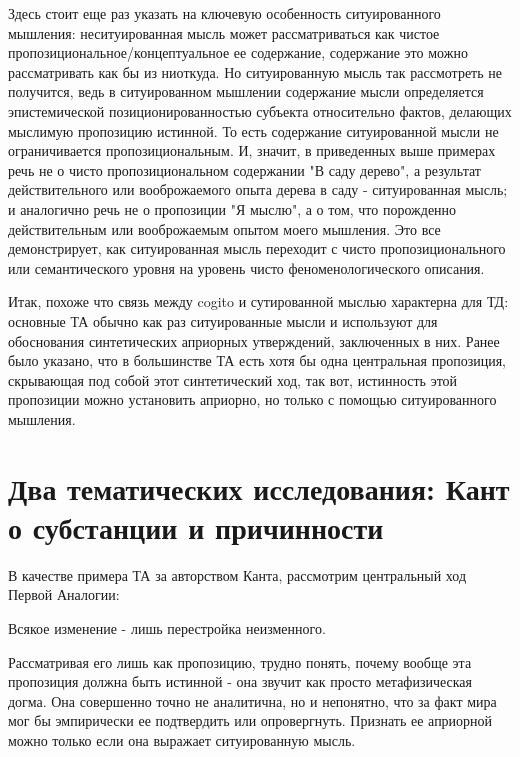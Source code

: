 \documentclass{article}
\begin{document}
Здесь стоит еще раз указать на ключевую особенность ситуированного мышления: неситуированная мысль может рассматриваться как чистое пропозициональное/концептуальное ее содержание, содержание это можно рассматривать как бы из ниоткуда. Но ситуированную мысль так рассмотреть не получится, ведь в ситуированном мышлении содержание мысли определяется эпистемической позиционированностью субъекта относительно фактов, делающих мыслимую пропозицию истинной. То есть содержание ситуированной мысли не ограничивается пропозициональным. И, значит, в приведенных выше примерах речь не о чисто пропозициональном содержании "В саду дерево", а результат действительного или вооброжаемого опыта дерева в саду - ситуированная мысль; и аналогично речь не о пропозиции "Я мыслю", а о том, что порожденно действительным или вооброжаемым опытом моего мышления. Это все демонстрирует, как ситуированная мысль переходит с чисто пропозиционального или семантического уровня на уровень чисто феноменологического описания.

Итак, похоже что связь между cogito и сутированной мыслью характерна для ТД: основные ТА обычно как раз ситуированные мысли и используют для обоснования синтетических априорных утверждений, заключенных в них. Ранее было указано, что в большинстве ТА есть хотя бы одна центральная пропозиция, скрывающая под собой этот синтетический ход, так вот, истинность этой пропозиции можно установить априорно, но только с помощью ситуированного мышления.

\section{Два тематических исследования: Кант о субстанции и причинности}

В качестве примера ТА за авторством Канта, рассмотрим центральный ход Первой Аналогии:

Всякое изменение - лишь перестройка неизменного.

Рассматривая его лишь как пропозицию, трудно понять, почему вообще эта пропозиция должна быть истинной - она звучит как просто метафизическая догма. Она совершенно точно не аналитична, но и непонятно, что за факт мира мог бы эмпирически ее подтвердить или опровергнуть. Признать ее априорной можно только если она выражает ситуированную мысль.
\end{document}
